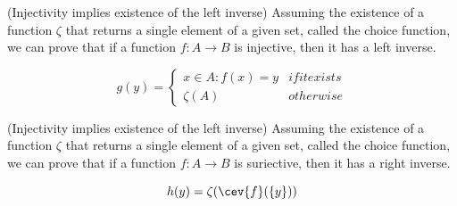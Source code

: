 \begin{lemma}(Injectivity implies existence of the left inverse)
\label{lem:injectiveInverse}
Assuming the existence of a function $\zeta$ that returns a single element of a given set, called the choice function, we can prove 
that if a function $f : A \rightarrow B$ is injective, then it has a left inverse.

\begin{equation*}
    g(y) =
    \begin{cases*}
        x \in A : f(x) = y & if it exists \\
        \zeta(A)           & otherwise
    \end{cases*}
\end{equation*}
\end{lemma}
    


\begin{lemma}(Injectivity implies existence of the left inverse)
\label{lem:suriectiveInverse}
Assuming the existence of a function $\zeta$ that returns a single element of a given set, called the choice function, we can prove 
that if a function $f : A \rightarrow B$ is suriective, then it has a right inverse.

\begin{equation*}
    h(y) = \zeta(\cev{f}(\{y\}))
\end{equation*}
\end{lemma}

